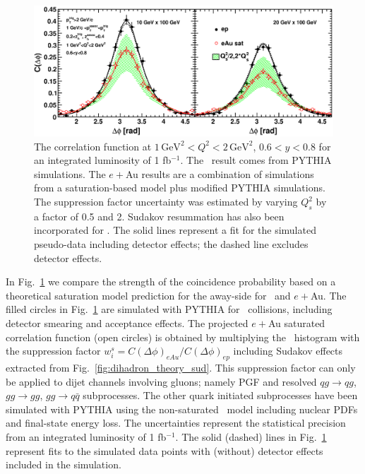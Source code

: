 \begin{figure}[hbt]
\begin{center}
\includegraphics[width=1.0\textwidth]{plots/chpt6/Q2_1_y_0.7_varying_Qs_uncertainty_Sud_withfit_smear.eps} 
\end{center} 
\caption[The predicted discrimination power of the dihadron correlation function in \ep\ and \eA\ at EIC energy scale under reasonable statistical uncertainty]{The correlation
function at $1\, \textrm{GeV}^{2}<Q^{2}<2 \, \textrm{GeV}^{2}$, $0.6<y<0.8$ for an  
integrated luminosity of 1 fb$^{-1}$. The \ep\ result comes from PYTHIA simulations.
The $e+$Au results are a combination of simulations from a saturation-based model plus modified
PYTHIA simulations. The suppression factor uncertainty was estimated by varying
$Q_{s}^{2}$ by a factor of 0.5 and 2. Sudakov resummation has also been incorporated
for \eAu. The solid lines represent a fit for the simulated pseudo-data
including detector effects; the dashed line excludes detector effects.}
\label{fig:correUncertainSud}
\end{figure}

In Fig.~\ref{fig:correUncertainSud} we compare the strength of the
coincidence probability based on a theoretical saturation model prediction for
the away-side for \ep\ and $e+$Au. The filled circles in
Fig.~\ref{fig:correUncertainSud} are simulated with PYTHIA
for \ep\ collisions, including detector smearing and acceptance effects.
The projected $e+$Au saturated correlation function (open circles) is
obtained by multiplying the \ep\ histogram with the suppression factor
$w^{s}_{i}=C(\Delta\phi)_{eAu}/C(\Delta\phi)_{ep}$ including Sudakov effects extracted
from Fig.~\ref{fig:dihadron_theory_sud}. This suppression factor can only be applied to
dijet channels involving gluons; namely PGF and resolved $qg\rightarrow qg$,
$gg\rightarrow gg$, $gg\rightarrow q\bar q$ subprocesses. The other quark
initiated subprocesses have been simulated with PYTHIA using the non-saturated
\eA\ model including nuclear PDFs and final-state energy loss. The uncertainties
represent the statistical precision from an integrated luminosity of 1
fb$^{-1}$. The solid (dashed) lines in Fig.~\ref{fig:correUncertainSud} represent
fits to the simulated data points with (without) detector effects included in
the simulation.

